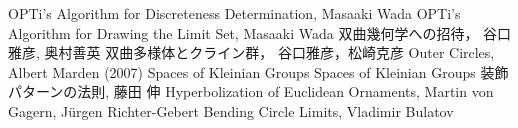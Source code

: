 {\begin{thebibliography}{99}
        OPTi's Algorithm for Discreteness Determination,
        Masaaki Wada
        OPTi's Algorithm for Drawing the Limit Set,
        Masaaki Wada
        双曲幾何学への招待，
        谷口雅彦, 奥村善英
        双曲多様体とクライン群，
        谷口雅彦，松崎克彦
        Outer Circles, Albert Marden (2007)
        Spaces of Kleinian Groups
        Spaces of Kleinian Groups
        装飾パターンの法則,
        藤田 伸
        Hyperbolization of Euclidean Ornaments,
        Martin von Gagern, Jürgen Richter-Gebert
        Bending Circle Limits,
        Vladimir Bulatov
\end{thebibliography}
}